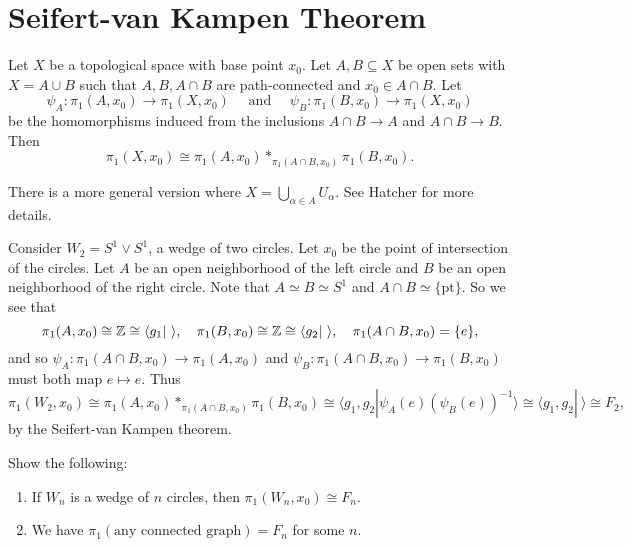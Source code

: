 \section{Seifert-van Kampen Theorem}
\begin{theorem}
  Let $X$ be a topological space with base point $x_0$.
  Let $A, B \subseteq X$ be open sets with
  $X = A \cup B$ such that $A, B, A \cap B$ are
  path-connected and $x_0 \in A \cap B$. Let
  \[
    \psi_A : \pi_1(A, x_0) \to \pi_1(X, x_0)
    \quad \text{ and } \quad
    \psi_B : \pi_1(B, x_0) \to \pi_1(X, x_0)
  \]
  be the homomorphisms induced from the inclusions
  $A \cap B \to A$ and $A \cap B \to B$. Then
  \[
    \pi_1(X, x_0) \cong \pi_1(A, x_0) *_{\pi_1(A \cap B, x_0)} \pi_1(B, x_0).
  \]
\end{theorem}

\begin{remark}
  There is a more general version where
  $X = \bigcup_{\alpha \in A} U_\alpha$. See Hatcher
  for more details.
\end{remark}

\begin{example}
  Consider $W_2 = S^1 \lor S^1$, a wedge of two circles.
  Let $x_0$ be the point of intersection of the circles.
  Let $A$ be an open neighborhood of the left circle
  and $B$ be an open neighborhood of the right circle.
  Note that $A \simeq B \simeq S^1$ and
  $A \cap B \simeq \{\text{pt}\}$. So we see that
  \[
    \pi_1(A, x_0) \cong \mathbb{Z} \cong
    \langle g_1 |\ \rangle, \quad
    \pi_1(B, x_0) \cong \mathbb{Z} \cong \langle g_2 |\ \rangle, \quad
    \pi_1(A \cap B, x_0) = \{e\},
  \]
  and so
  $\psi_A : \pi_1(A \cap B, x_0) \to \pi_1(A, x_0)$ and
  $\psi_B : \pi_1(A \cap B, x_0) \to \pi_1(B, x_0)$
  must both map $e \mapsto e$. Thus
  \[
    \pi_1(W_2, x_0) \cong \pi_1(A, x_0) *_{\pi_1(A \cap B, x_0)} \pi_1(B, x_0)
    \cong \langle g_1, g_2 | \psi_A(e)(\psi_B(e))^{-1} \rangle
    \cong \langle g_1, g_2 | \ \rangle
    \cong F_2,
  \]
  by the Seifert-van Kampen theorem.
\end{example}

\begin{exercise}
  Show the following:
  \begin{enumerate}
    \item If $W_n$ is a wedge of $n$ circles,
      then $\pi_1(W_n, x_0) \cong F_n$.
    \item We have
      $\pi_1(\text{any connected graph}) = F_n$
      for some $n$.
  \end{enumerate}
\end{exercise}

